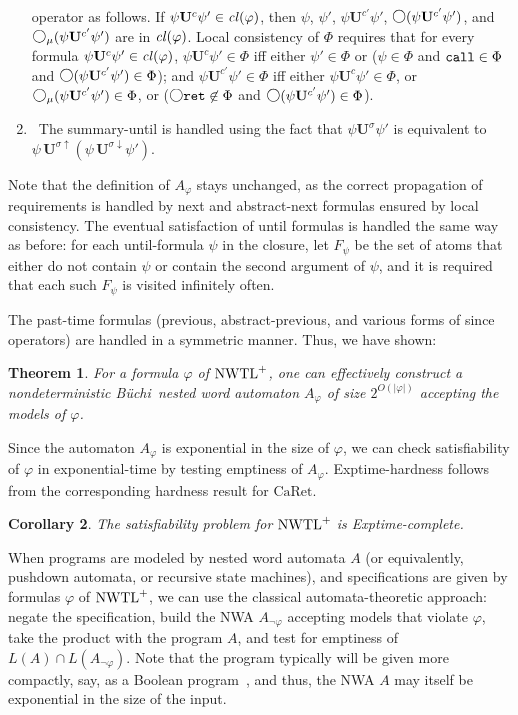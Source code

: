\documentclass{LMCS}
\newcommand{\M}{{\mu}}
\newcommand{\dm}{\Diamond}
\newcommand{\U}{{\mathbf U}}
\newcommand{\next}{\text{\raisebox{1pt}{$\bigcirc$}}}
\theoremstyle{plain}
\newtheorem{theorem}{Theorem}[section]
\newtheorem{corollary}[theorem]{Corollary}
\theoremstyle{definition}
\newcommand{\ppath}{\sigma} \newcommand{\Ul}{\U}
\newcommand{\Uc}{\U^c}
\newcommand{\aUc}{\U^{c'}}
\newcommand{\Up}{\U^\ppath}
\newcommand{\puntil}{\Up}
\newcommand{\EXPTIME}{{\sc Exptime}}
\newcommand{\caret}{\text{CaRet}}
\newcommand{\retr}{\mathit{ret}}
\def\Cl{{\it cl\/}}
\def\buchi{B\"{u}chi}
\newcommand{\dpuntil}{{\,\U^{\ppath\downarrow}}}
\newcommand{\upuntil}{{\,\U^{\ppath\uparrow}}}
\newcommand{\nwtlp}{\nwtl^+}
\newcommand{\rett}{{\tt ret}}
\newcommand{\call}{{\tt call}}
\renewcommand{\retr}{\rett}
\newcommand{\dmm}{\dm_{\M}}
\renewcommand{\dm}{\next}
\renewcommand{\dmm}{\dm_\M}
\begin{document}
\begin{enumerate}
operator as follows.
If $\psi \Uc \psi'\in\Cl(\varphi)$, then $\psi$, $\psi'$, $\psi\aUc \psi'$,
$\next(\psi\aUc \psi')$, and 
$\dmm(\psi\aUc \psi')$ are in
$\Cl(\varphi)$.
Local consistency of $\Phi$ requires that
for every formula $\psi\Uc\psi'\in \Cl(\varphi)$,
           $\psi \Uc \psi' \in \Phi$ iff
           either $\psi' \in \Phi$ or ($\psi \in \Phi$ and $\call\in \Phi$ and
  $\next(\psi \aUc \psi') \in \Phi$);
and 
           $\psi \aUc \psi' \in \Phi$ iff
           either $\psi\Uc \psi'\in\Phi$, or $\dmm(\psi \aUc \psi') \in \Phi$, or
 ($\next\retr\not\in\Phi$ and $\next(\psi \aUc \psi') \in \Phi$).
\item{}\
 The summary-until is handled using the fact that
$\psi\puntil\psi'$ is equivalent to
$\psi\upuntil(\psi\dpuntil\psi')$.
\end{enumerate}\smallskip

\noindent Note that the definition of $A_\varphi$ stays unchanged, as
the correct propagation of requirements is handled by next and
abstract-next formulas ensured by local consistency. The eventual
satisfaction of until formulas is handled the same way as before: for
each until-formula $\psi$ in the closure, let $F_\psi$ be the set of
atoms that either do not contain $\psi$ or contain the second argument
of $\psi$, and it is required that each such $F_\psi$ is visited
infinitely often.

The past-time formulas (previous, abstract-previous, and various forms of since
operators) are handled in a symmetric manner.
Thus, we have shown:

\begin{theorem}\label{exp-buchi}
For a formula $\varphi$ of $\nwtlp$,
one can effectively construct a nondeterministic \buchi\ nested word automaton $A_\varphi$
of size $2^{O(|\varphi|)}$ accepting 
the models of $\varphi$.
\end{theorem}

Since the automaton $A_\varphi$ is exponential in the size of $\varphi$, we
can check satisfiability of $\varphi$ in exponential-time by testing emptiness
of $A_\varphi$. \EXPTIME-hardness follows from the corresponding hardness result for
$\caret$.

\begin{corollary}
The satisfiability problem for $\nwtlp$ is \EXPTIME-complete.
\end{corollary}

When programs are modeled by nested word automata $A$ (or
equivalently, pushdown automata, or recursive state machines), and
specifications are given by formulas $\varphi$ of  $\nwtlp$, 
we can use the classical automata-theoretic approach:
negate the specification, build the NWA $A_{\neg\varphi}$ accepting
models that violate $\varphi$, take the product with the program
$A$, and test for emptiness of $L(A)\cap L(A_{\neg\varphi})$.  Note
that the program typically will be given more compactly, say, as a
Boolean program~\cite{BallRajamani}, and thus, the NWA $A$ may itself
be exponential in the size of the input.
\end{document}
